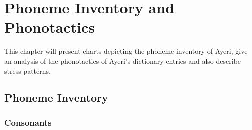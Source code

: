 \chapter{Phoneme Inventory and Phonotactics}

This chapter will present charts depicting the phoneme inventory of Ayeri, 
give an analysis of the phonotactics of Ayeri's dictionary entries and also 
describe stress patterns.

\section{Phoneme Inventory}

\subsection{Consonants}


